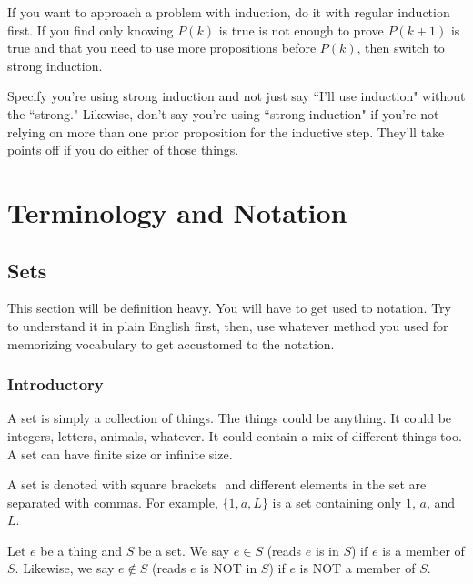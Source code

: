 \documentclass[11pt]{scrartcl}
\begin{document}
\begin{advice}
    If you want to approach a problem with induction, do it with regular induction first. If you find only knowing $P(k)$ is true is not enough to prove $P(k+1)$ is true and that you need to use more propositions before $P(k)$, then switch to strong induction.
\end{advice}

\begin{caveat}
    Specify you're using strong induction and not just say ``I'll use induction" without the ``strong." Likewise, don't say you're using ``strong induction" if you're not relying on more than one prior proposition for the inductive step. They'll take points off if you do either of those things.
\end{caveat}

\section{Terminology and Notation}

\subsection{Sets}

This section will be definition heavy. You will have to get used to notation. Try to understand it in plain English first, then, use whatever method you used for memorizing vocabulary to get accustomed to the notation.

\subsubsection{Introductory}

\begin{definition}[Set]
    A set is simply a collection of things. The things could be anything. It could be integers, letters, animals, whatever. It could contain a mix of different things too. A set can have finite size or infinite size.
\end{definition}
A set is denoted with square brackets ${}$ and different elements in the set are separated with commas. For example, $\{1, a, L\}$ is a set containing only $1$, $a$, and $L$.

\begin{definition}[$\in$]
Let $e$ be a thing and $S$ be a set. We say $e \in S$ (reads $e$ is in $S$) if $e$ is a member of $S$. Likewise, we say $e \notin S$ (reads $e$ is NOT in $S$) if $e$ is NOT a member of $S$.
\end{definition}
\end{document}
